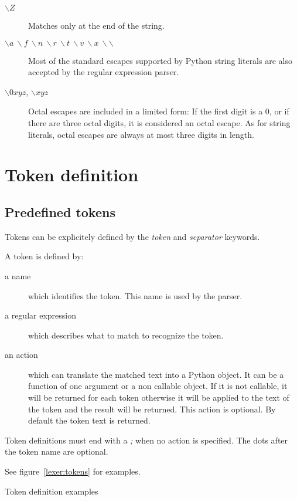 \begin{description}
    \item [$\backslash Z$]
    Matches only at the end of the string.
    \item [$\backslash a ~ \backslash f ~ \backslash n ~ \backslash r ~ \backslash t ~ \backslash v ~ \backslash x ~ \backslash\backslash$]
    Most of the standard escapes supported by Python string literals are also accepted by the regular expression parser.
    \item [$\backslash 0xyz$, $\backslash xyz$] Octal escapes are included in a limited form: If the first digit is a 0, or if there are three octal digits, it is considered an octal escape. As for string literals, octal escapes are always at most three digits in length. 
\end{description}

\section{Token definition}                                  \label{lexer:token_def}

\subsection{Predefined tokens}

Tokens can be explicitely defined by the \emph{token} and \emph{separator} keywords.

A token is defined by:

\begin{description}
    \item [a name] which identifies the token.
        This name is used by the parser.
    \item [a regular expression] which describes what to match to recognize the token.
    \item [an action] which can translate the matched text into a Python object. It can be a function of one argument or a non callable object. If it is not callable, it will be returned for each token otherwise it will be applied to the text of the token and the result will be returned. This action is optional. By default the token text is returned.
\end{description}

Token definitions must end with a \emph{;} when no action is specified. The dots after the token name are optional.

See figure~\ref{lexer:tokens} for examples.

\begin{code}
\caption{Token definition examples}                         \label{lexer:tokens}
\end{code}

